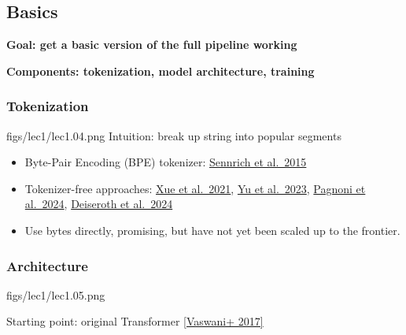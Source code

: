 \clearpage

\subsection{Basics}

\textbf{{\color{tred} Goal: get a basic version of the full pipeline working}}

\textbf{{\color{dblue} Components: tokenization, model architecture, training
}}
\subsubsection{Tokenization}
\MarginImageWithNote
  {figs/lec1/lec1.04.png}
  {}
  {Intuition: break up string into popular segments
  }
  

\begin{itemize}[leftmargin=0em,label={},noitemsep]
  \item Byte-Pair Encoding (BPE) tokenizer: 
    \href{https://arxiv.org/abs/1508.07909}{Sennrich et al.\ 2015}
  \item Tokenizer-free approaches: 
    \href{https://arxiv.org/abs/2105.13626}{Xue et al.\ 2021}, 
    \href{https://arxiv.org/pdf/2305.07185.pdf}{Yu et al.\ 2023}, 
    \href{https://arxiv.org/abs/2412.09871}{Pagnoni et al.\ 2024}, 
    \href{https://arxiv.org/abs/2406.19223}{Deiseroth et al.\ 2024}
  \item Use bytes directly, promising, but have not yet been scaled up to the frontier.
\end{itemize}


\subsubsection{Architecture}
\MarginImageWithNote
  {figs/lec1/lec1.05.png}
  {}
  
Starting point: original Transformer \href{https://arxiv.org/pdf/1706.03762.pdf}{[Vaswani+ 2017]}

